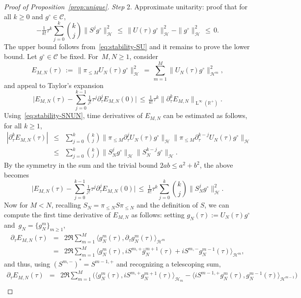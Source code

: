\documentclass[a4paper,11pt,reqno,noindent]{amsart}
\theoremstyle{plain}
\numberwithin{equation}{section}
\newcommand{\R}{\mathbb R}
\newcommand{\Cc}{\mathcal C}
\newcommand{\Hc}{\mathcal H}
\newcommand{\3}{|\!|\!|}
\newcommand{\Ld}{\operatorname{L}}
\newcommand{\step}[1]{\noindent \textit{Step} #1.}
\begin{document}
\begin{proof}[Proof of Proposition~\ref{prop:unique}]
\medskip
\step2 Approximate unitarity: proof that for all $k\ge0$ and $g^\circ\in\Cc$,
\begin{equation}\label{eq:approx-unit-pr}
-\tfrac{1}{k!}\tau^k\sum_{j=0}^k\binom{k}{j}\|S^{j}g^\circ\|_\Hc^2\,\le\,\|U(\tau)g^\circ\|_\Hc^2-\|g^\circ\|_\Hc^2\,\le\,0.
\end{equation}
The upper bound follows from~\eqref{eq:stability-SU} and it remains to prove the lower bound.
Let $g^\circ\in\Cc$ be fixed.
For~$M,N\ge1$, consider
\[E_{M,N}(\tau)\,:=\,\|\pi_{\le M}U_N(\tau)g^\circ\|^2_\Hc\,=\,\sum_{m=1}^M\|U_N(\tau)g^\circ\|_{\Hc^m}^2,\]
and appeal to Taylor's expansion
\begin{equation*}
\Big|E_{M,N}(\tau)-\sum_{j=0}^{k-1}\tfrac1{j!}\tau^j\partial_\tau^jE_{M,N}(0)\Big|\,\le\,\tfrac1{k!}\tau^k\|\partial_\tau^kE_{M,N}\|_{\Ld^{\infty}(\R^+)}.
\end{equation*}
Using~\eqref{eq:stability-SNUN}, time derivatives of $E_{M,N}$ can be estimated as follows, for all $k\ge1$,
\begin{eqnarray*}
|\partial_\tau^k E_{M,N}(\tau)|
&\le&\sum_{j=0}^k\binom{k}{j}\|\pi_{\le M}\partial_\tau^jU_N(\tau)g^\circ\|_\Hc\|\pi_{\le M}\partial_\tau^{k-j}U_N(\tau)g^\circ\|_\Hc\\
&\le&\sum_{j=0}^k\binom{k}{j}\|S_N^jg^\circ\|_\Hc\|S_N^{k-j}g^\circ\|_\Hc.
\end{eqnarray*}
By the symmetry in the sum and the trivial bound $2ab\leq a^2+b^2$, the above becomes
\begin{equation}\label{eq:EM-Taylor}
\Big|E_{M,N}(\tau)-\sum_{j=0}^{k-1}\tfrac1{j!}\tau^j\partial_\tau^jE_{M,N}(0)\Big|\,\le\,\tfrac1{k!}\tau^k\sum_{j=0}^k\binom{k}{j}\|S_N^jg^\circ\|_\Hc^2.
\end{equation}
Now for $M< N$, recalling $S_N=\pi_{\le N}S\pi_{\le N}$ and the definition of $S$, we can compute the first time derivative of $E_{M,N}$ as follows: setting $g_N(\tau):=U_N(\tau)g^\circ$ and~$g_N=\{g_N^m\}_{m\ge1}$,
\begin{eqnarray*}
\partial_\tau E_{M,N}(\tau)&=&2\Re\sum_{m=1}^M\langle g_N^m(\tau),\partial_\tau g_N^m(\tau)\rangle_{\Hc^m}\\
&=&2\Re\sum_{m=1}^M \big\langle g^m_N(\tau),iS^{m,+}\bar g^{m+1}_N(\tau)+iS^{m,-} g^{m-1}_N(\tau)\big\rangle_{\Hc^m},
\end{eqnarray*}
and thus, using $(S^{m,-})^*=S^{m-1,+}$ and recognizing a telescoping sum,
\begin{eqnarray*}
\partial_\tau E_{M,N}(\tau)
&=&2\Re\sum_{m=1}^M \Big(\langle g^m_N(\tau),iS^{m,+} g^{m+1}_N(\tau)\rangle_{\Hc_m}-\langle iS^{m-1,+} g^m_N(\tau),g^{m-1}_N(\tau)\rangle_{\Hc^{m-1}}\Big)\\

\end{eqnarray*}
\end{proof}
\end{document}
